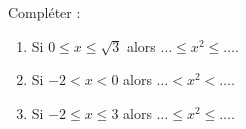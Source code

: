 
\begin{exercice}\label{exosmath-0659}

    Compléter :
    \begin{enumerate}
        \item
            Si \( 0\leq x\leq\sqrt{3}\) alors \( \ldots\leq x^2\leq \ldots\).
        \item
            Si \( -2< x<0\) alors \( \ldots<x^2< \ldots\).
        \item
            Si \( -2\leq x\leq3\) alors \( \ldots\leq x^2\leq \ldots\).
    \end{enumerate}

\end{exercice}
